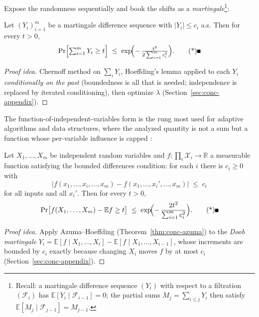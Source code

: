 Expose the randomness sequentially and book the shifts as a
\emph{martingale}\footnote{Recall: a martingale difference sequence $(Y_i)$ with respect
to a filtration $(\mathcal{F}_i)$ has $\mathbb{E}[Y_i \mid \mathcal{F}_{i-1}] = 0$; the
partial sums $M_j = \sum_{i\le j} Y_i$ then satisfy $\mathbb{E}[M_j \mid
\mathcal{F}_{j-1}] = M_{j-1}$.}:

\begin{theorem}\label{thm:conc-azuma}
Let $(Y_i)_{i=1}^m$ be a martingale difference sequence with $|Y_i| \le c_i$ a.s. Then
for every $t > 0$,
\[
\Pr\Bigl[\textstyle\sum_{i=1}^m Y_i \ge t\Bigr] \;\le\;
\exp\!\Bigl(-\, \frac{t^2}{2\sum_{i=1}^m c_i^2}\Bigr). \eopm
\]
\end{theorem}

\begin{proof}[Proof idea]
Chernoff method on $\sum_i Y_i$, Hoeffding's lemma applied to each $Y_i$
\emph{conditionally on the past} (boundedness is all that is needed; independence is
replaced by iterated conditioning), then optimize $\lambda$
(Section~\ref{sec:conc-appendix}).
\end{proof}

The function-of-independent-variables form is the rung most used for adaptive
algorithms and data structures, where the analyzed quantity is not a sum but a function
whose per-variable influence is capped
\cite{concentration-ineq-bg4,concentration-ineq-bg5,concentration-ineq-bg6}:

\begin{theorem}\label{thm:conc-mcdiarmid}
Let $X_1,\dots,X_m$ be independent random variables and
$f\colon \prod_i \mathcal{X}_i \to \mathbb{R}$ a measurable function satisfying the
bounded differences condition: for each $i$ there is $c_i \ge 0$ with
\[
\bigl|f(x_1,\dots,x_i,\dots,x_m) - f(x_1,\dots,x_i',\dots,x_m)\bigr| \;\le\; c_i
\]
for all inputs and all $x_i'$. Then for every $t > 0$,
\[
\Pr\bigl[f(X_1,\dots,X_m) - \mathbb{E}f \ge t\bigr] \;\le\;
\exp\!\Bigl(-\, \frac{2t^2}{\sum_{i=1}^m c_i^2}\Bigr). \eopm
\]
\end{theorem}

\begin{proof}[Proof idea]
Apply Azuma--Hoeffding (Theorem~\ref{thm:conc-azuma}) to the \emph{Doob martingale}
$Y_i = \mathbb{E}[f \mid X_1,\dots,X_i] - \mathbb{E}[f \mid X_1,\dots,X_{i-1}]$, whose
increments are bounded by $c_i$ exactly because changing $X_i$ moves $f$ by at most
$c_i$ (Section~\ref{sec:conc-appendix}).
\end{proof}

